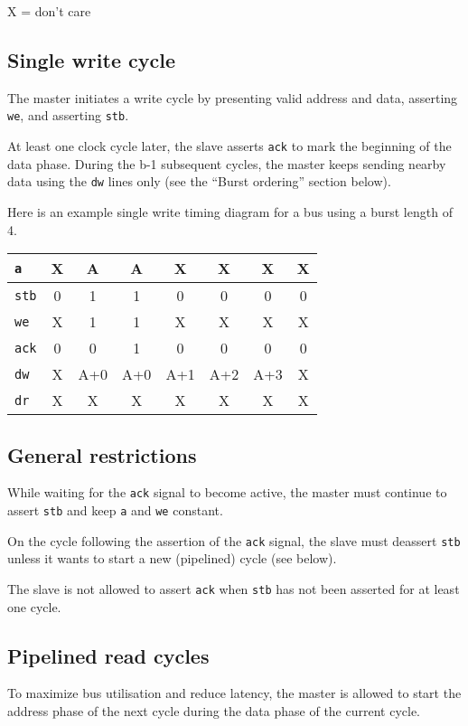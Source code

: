 \documentclass[a4paper,11pt]{article}
\begin{document}
X = don't care

\subsection{Single write cycle}
The master initiates a write cycle by presenting valid address and data, asserting \verb!we!, and asserting \verb!stb!.

At least one clock cycle later, the slave asserts \verb!ack! to mark the beginning of the data phase. During the b-1 subsequent cycles, the master keeps sending nearby data using the \verb!dw! lines only (see the ``Burst ordering'' section below).

Here is an example single write timing diagram for a bus using a burst length of 4.

\begin{tabular}{|l|c|c|c|c|c|c|c|}
\hline
\verb!a! & X & A & A & X & X & X & X \\
\hline
\verb!stb! & 0 & 1 & 1 & 0 & 0 & 0 & 0 \\
\hline
\verb!we! & X & 1 & 1 & X & X & X & X \\
\hline
\verb!ack! & 0 & 0 & 1 & 0 & 0 & 0 & 0 \\
\hline
\verb!dw! & X & A+0 & A+0 & A+1 & A+2 & A+3 & X \\
\hline
\verb!dr! & X & X & X & X & X & X & X \\
\hline
\end{tabular}

\subsection{General restrictions}
While waiting for the \verb!ack! signal to become active, the master must continue to assert \verb!stb! and keep \verb!a! and \verb!we! constant.

On the cycle following the assertion of the \verb!ack! signal, the slave must deassert \verb!stb! unless it wants to start a new (pipelined) cycle (see below).

The slave is not allowed to assert \verb!ack! when \verb!stb! has not been asserted for at least one cycle.

\subsection{Pipelined read cycles}
To maximize bus utilisation and reduce latency, the master is allowed to start the address phase of the next cycle during the data phase of the current cycle.
\end{document}
